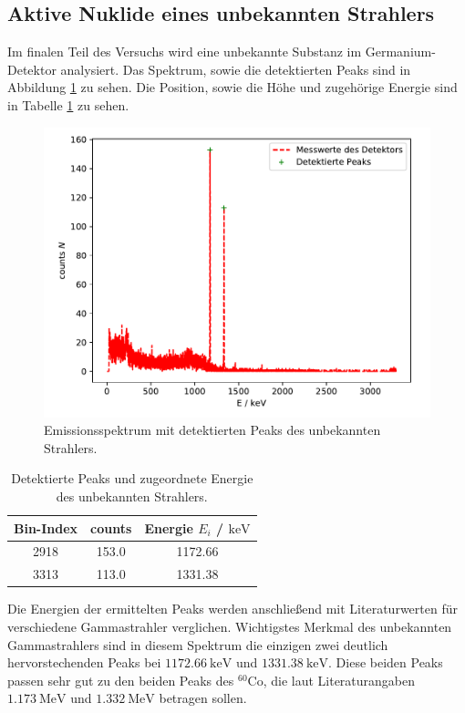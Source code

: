 \subsection{Aktive Nuklide eines unbekannten Strahlers}
Im finalen Teil des Versuchs wird eine unbekannte Substanz im Germanium-Detektor analysiert. Das Spektrum, sowie die detektierten Peaks sind in Abbildung \ref{abb:unbekannt} zu sehen. Die Position, sowie die Höhe und zugehörige Energie sind in Tabelle \ref{tab:unbekannt} zu sehen.
\FloatBarrier
\begin{figure}
    \centering
    \includegraphics[scale=0.7]{unbekannterStrahler.pdf}
    \caption{Emissionsspektrum mit detektierten Peaks des unbekannten Strahlers.}
    \label{abb:unbekannt}
\end{figure}
\FloatBarrier
\begin{table}
    \centering
    \caption{Detektierte Peaks und zugeordnete Energie des unbekannten Strahlers.}
    \label{tab:unbekannt}
    \begin{tabular}{ c c c }
    \toprule
    {Bin-Index} & {counts } & {Energie $E_i$ / $\si{\kilo\electronvolt}$}\\
    \midrule
    2918 & 153.0 & 1172.66       \\
    3313 & 113.0 & 1331.38       \\
    \bottomrule
    \end{tabular}
\end{table}
\FloatBarrier

\noindent Die Energien der ermittelten Peaks werden anschließend mit Literaturwerten für verschiedene Gammastrahler verglichen. Wichtigstes Merkmal des unbekannten Gammastrahlers sind in diesem Spektrum die einzigen zwei deutlich hervorstechenden Peaks bei $\SI{1172,66}{\kilo \electronvolt}$ und $\SI{1331,38}{\kilo \electronvolt}$. Diese beiden Peaks passen sehr gut zu den beiden Peaks des $^{60}$Co, die laut Literaturangaben \cite{Q4} $\SI{1,173}{\mega \electronvolt}$ und $\SI{1,332}{\mega \electronvolt}$ betragen sollen.

